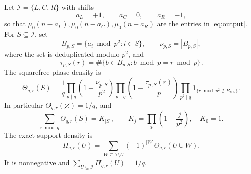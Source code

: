 \documentclass[11pt]{article}
\theoremstyle{definition}
\theoremstyle{remark}
\newcommand{\mob}{\mu}
\newcommand{\ind}{\mathbf 1}
\begin{document}
Let \(\mathcal I=\{L,C,R\}\) with shifts
\begin{equation}
 a_L=+1,\qquad a_C=0,\qquad a_R=-1,
 \label{eq:shifts}
\end{equation}
so that \(\mob_0(n-a_L),\mob_0(n-a_C),\mob_0(n-a_R)\) are the entries
in \eqref{eq:output}.  For \(S\subseteq\mathcal I\), set
\[
 B_{p,S}=\{a_i\bmod p^2:i\in S\},\qquad
 \nu_{p,S}=|B_{p,S}|,
\]
where the set is deduplicated modulo \(p^2\), and
\[
 \tau_{p,S}(r)=
 \#\{b\in B_{p,S}:b\bmod p=r\bmod p\}.
\]
The squarefree phase density is
\begin{equation}
 \Theta_{q,r}(S)=\frac1q
 \prod_{p\nmid q}\left(1-\frac{\nu_{p,S}}{p^2}\right)
 \prod_{p\parallel q}\left(1-\frac{\tau_{p,S}(r)}p\right)
 \prod_{p^2\mid q}\ind_{\{r\bmod p^2\notin B_{p,S}\}}.
 \label{eq:theta}
\end{equation}
In particular \(\Theta_{q,r}(\varnothing)=1/q\), and
\begin{equation}
 \sum_{r\bmod q}\Theta_{q,r}(S)=K_{|S|},\qquad
 K_j=\prod_p\left(1-\frac{j}{p^2}\right),\quad K_0=1.
 \label{eq:Kj}
\end{equation}
The exact-support density is
\begin{equation}
 \Pi_{q,r}(U)=
 \sum_{W\subseteq\mathcal I\setminus U}
 (-1)^{|W|}\Theta_{q,r}(U\cup W).
 \label{eq:Pi}
\end{equation}
It is nonnegative and \(\sum_{U\subseteq\mathcal I}\Pi_{q,r}(U)=1/q\).
\end{document}

